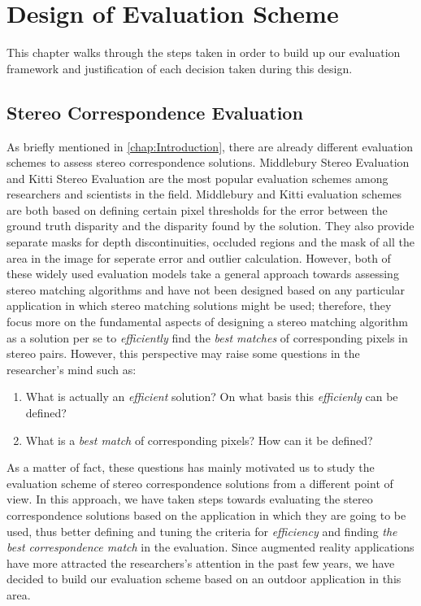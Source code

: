 \chapter{Design of Evaluation Scheme}
\label{chap:System}

This chapter walks through the steps taken in order to build up our evaluation framework and justification of each decision taken during this design.

\section{Stereo Correspondence Evaluation}

As briefly mentioned in \ref{chap:Introduction}, there are already different evaluation schemes to assess stereo correspondence solutions. Middlebury Stereo Evaluation \cite{mideval} and 
Kitti Stereo Evaluation \cite{kitti} are the most popular evaluation schemes among researchers and scientists in the field. 
Middlebury and Kitti evaluation schemes are both based on defining certain pixel thresholds for the error between the ground truth disparity and the disparity found by the solution. 
They also provide separate masks for depth discontinuities, occluded regions and the mask of all the area in the image for seperate error and outlier calculation.
However, both of these widely used evaluation models take a general approach towards assessing stereo matching algorithms and have not been designed based on any particular application in which 
stereo matching solutions might be used; therefore, they focus more on the fundamental aspects of designing a stereo matching algorithm as a solution per se to \textit{efficiently}
find the \textit{best matches} of corresponding pixels in stereo pairs. 
However, this perspective may raise some questions in the researcher's mind such as:

\begin{enumerate}
\item What is actually an \textit{efficient} solution? On what basis this \textit{efficienly} can be defined?
\item What is a \textit{best match} of corresponding pixels? How can it be defined?
\end{enumerate}

As a matter of fact, these questions has mainly motivated us to study the evaluation scheme of stereo correspondence solutions from a different point of view. 
In this approach, we have taken steps towards evaluating the stereo correspondence solutions based on the application in which they are going to be used, 
thus better defining and tuning the criteria for \textit{efficiency} and 
finding \textit{the best correspondence match} in the evaluation. Since augmented reality applications have more attracted the researchers's attention in the past few years, 
we have decided to build our evaluation scheme based on an outdoor application in this area.

